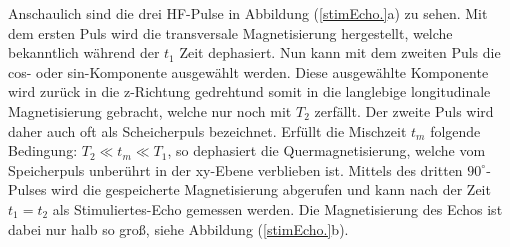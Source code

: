 Anschaulich sind die drei HF-Pulse in Abbildung (\ref{stimEcho.}a) zu sehen.
Mit dem ersten Puls wird die transversale Magnetisierung hergestellt, welche bekanntlich w\"{a}hrend der $t_1$ Zeit dephasiert.
Nun kann mit dem zweiten Puls die cos- oder sin-Komponente ausgew\"{a}hlt werden.
Diese ausgew\"{a}hlte Komponente wird zur\"{u}ck in die z-Richtung gedrehtund somit in die langlebige longitudinale Magnetisierung gebracht, welche nur noch mit $T_2$ zerf\"{a}llt.
Der zweite Puls wird daher auch oft als Scheicherpuls bezeichnet.
Erf\"{u}llt die Mischzeit $t_m$ folgende Bedingung: $T_2 \ll t_m \ll T_1 $, so dephasiert die Quermagnetisierung, welche vom Speicherpuls unber\"{u}hrt in der xy-Ebene verblieben ist.
Mittels des dritten $90^{\circ}$-Pulses wird die gespeicherte Magnetisierung abgerufen und kann nach der Zeit $t_1 = t_2$ als Stimuliertes-Echo gemessen werden.
Die Magnetisierung des Echos ist dabei nur halb so gro{\ss}, siehe Abbildung (\ref{stimEcho.}b).
